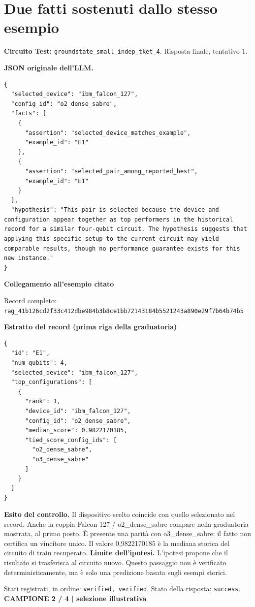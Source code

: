 \documentclass[a4paper,10pt]{article}
\newcommand{\tagline}[1]{{\small\color{ink}\textbf{#1}}\par}
\begin{document}
\section*{Due fatti sostenuti dallo stesso esempio}
\textbf{Circuito Test:} \texttt{groundstate\_small\_indep\_tket\_4}. Risposta finale, tentativo 1.\par
\textbf{JSON originale dell'LLM.}
\begin{lstlisting}
{
  "selected_device": "ibm_falcon_127",
  "config_id": "o2_dense_sabre",
  "facts": [
    {
      "assertion": "selected_device_matches_example",
      "example_id": "E1"
    },
    {
      "assertion": "selected_pair_among_reported_best",
      "example_id": "E1"
    }
  ],
  "hypothesis": "This pair is selected because the device and configuration appear together as top performers in the historical record for a similar four-qubit circuit. The hypothesis suggests that applying this specific setup to the current circuit may yield comparable results, though no performance guarantee exists for this new instance."
}
\end{lstlisting}

\textbf{Collegamento all'esempio citato}
\begin{center}\end{center}
{\footnotesize Record completo: \texttt{rag\_41b126cd2f33c412dbe984b3b8ce1bb72143184b5521243a890e29f7b64b74b5}}\par
\textbf{Estratto del record (prima riga della graduatoria)}
\begin{lstlisting}
{
  "id": "E1",
  "num_qubits": 4,
  "selected_device": "ibm_falcon_127",
  "top_configurations": [
    {
      "rank": 1,
      "device_id": "ibm_falcon_127",
      "config_id": "o2_dense_sabre",
      "median_score": 0.9822170185,
      "tied_score_config_ids": [
        "o2_dense_sabre",
        "o3_dense_sabre"
      ]
    }
  ]
}
\end{lstlisting}

\textbf{Esito del controllo.} Il dispositivo scelto coincide con quello selezionato nel record. Anche la coppia Falcon 127 / o2\_dense\_sabre compare nella graduatoria mostrata, al primo posto. È presente una parità con o3\_dense\_sabre: il fatto non certifica un vincitore unico. Il valore 0,9822170185 è la mediana storica del circuito di train recuperato.
{\color{warn}\textbf{Limite dell'ipotesi.}} L'ipotesi propone che il risultato si trasferisca al circuito nuovo. Questo passaggio non è verificato deterministicamente, ma è solo una predizione basata sugli esempi storici.\par
{\small Stati registrati, in ordine: \texttt{verified, verified}. Stato della risposta: \texttt{success}.}
\newpage
\tagline{CAMPIONE 2 / 4 | selezione illustrativa}
\end{document}
